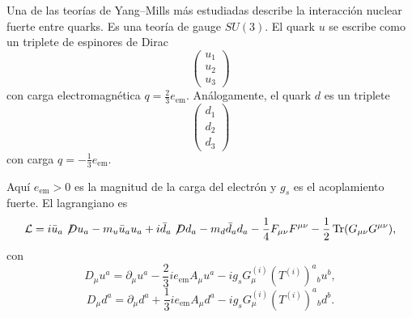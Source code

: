 \documentclass[11pt,a4paper]{article}
\newcommand{\Tr}{\operatorname{Tr}}
\begin{document}
Una de las teorías de Yang--Mills más estudiadas describe la interacción
nuclear fuerte entre quarks. Es una teoría de gauge $SU(3)$. El quark $u$ se
escribe como un triplete de espinores de Dirac
\[
  \begin{pmatrix}
    u_1\\
    u_2\\
    u_3
  \end{pmatrix}
\]
con carga electromagnética $q=\frac23e_{\mathrm{em}}$. Análogamente, el quark $d$ es un
triplete
\[
  \begin{pmatrix}
    d_1\\
    d_2\\
    d_3
  \end{pmatrix}
\]
con carga $q=-\frac13e_{\mathrm{em}}$.

Aquí $e_{\mathrm{em}}>0$ es la magnitud de la carga del electrón
y $g_s$ es el acoplamiento fuerte. El lagrangiano es
\[
  \mathcal L=
  i\bar u_a\not\!D u_a-m_u\bar u_a u_a
  +i\bar d_a\not\!D d_a-m_d\bar d_a d_a
  -\frac14F_{\mu\nu}F^{\mu\nu}
  -\frac12\Tr(G_{\mu\nu}G^{\mu\nu}),
\]
con
\[
  D_\mu u^a
  =\partial_\mu u^a-\frac23ie_{\mathrm{em}}A_\mu u^a
   -ig_sG_\mu^{(i)}(T^{(i)})^a{}_{b}u^b,
\]
\[
  D_\mu d^a
  =\partial_\mu d^a+\frac13ie_{\mathrm{em}}A_\mu d^a
   -ig_sG_\mu^{(i)}(T^{(i)})^a{}_{b}d^b.
\]
\end{document}
